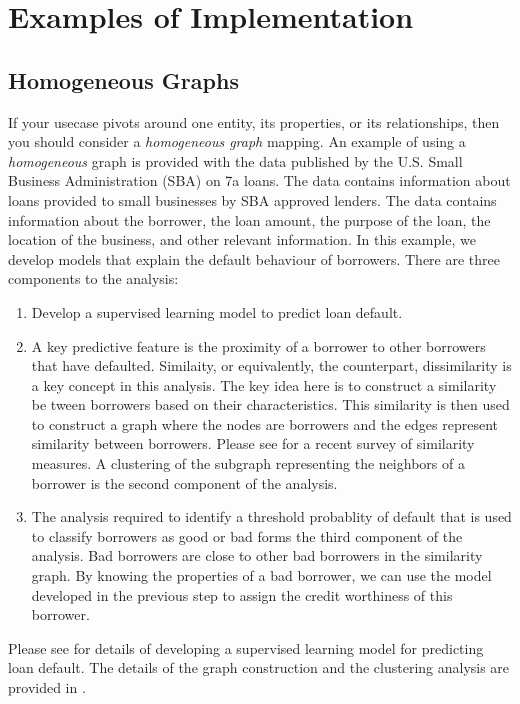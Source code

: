 \documentclass{article}
\begin{document}
\section{Examples of Implementation}\label{sec:examples_of_implementation}

\subsection{Homogeneous Graphs}\label{sec:homogeneous_graph_example}
If your usecase pivots around one entity, its properties, or its relationships, then you should consider a \emph{homogeneous graph} mapping. An example of using a \emph{homogeneous} graph is provided with the data published by the U.S. Small Business Administration (SBA) on 7a loans. The data contains information about loans provided to small businesses by SBA approved lenders. The data contains information about the borrower, the loan amount, the purpose of the loan, the location of the business, and other relevant information. In this example, we develop models that explain the default behaviour of borrowers. There are three components to the analysis:
\begin{enumerate}
    \item Develop a supervised learning model to predict loan default.
    \item A key predictive feature is the proximity of a borrower to other borrowers that have defaulted. Similaity, or equivalently, the counterpart, dissimilarity is a key concept in this analysis. The key idea here is to construct a similarity be tween borrowers based on their characteristics. This similarity is then used to construct a graph where the nodes are borrowers and the edges represent similarity between borrowers. Please see \cite{levy2024guide} for a recent survey of similarity measures. A clustering of the subgraph representing the neighbors of a borrower is the second component of the analysis.
    \item The analysis required to identify a threshold probablity of default that is used to classify borrowers as good or bad forms the third component of the analysis. Bad borrowers are close to other bad borrowers in the similarity graph. By knowing the properties of a bad borrower, we can use the model developed in the previous step to assign the credit worthiness of this borrower.
\end{enumerate}

Please see \href{https://github.com/rajivsam/descriptive_analytics/blob/main/examples/sba_7a_loans_analysis/sba_7a_loans_desc_analysis.pdf}{\cite{sba_7a_bad_loans_pred_model} }for details of developing a supervised learning model for predicting loan default. The details of the graph construction and the clustering analysis are provided in \href{https://github.com/rajivsam/descriptive_analytics/blob/main/examples/sba_7a_loans_analysis/sba_7a_risky_borrower_analysis.pdf}{\cite{sba_risky_borrower}}.
\end{document}
